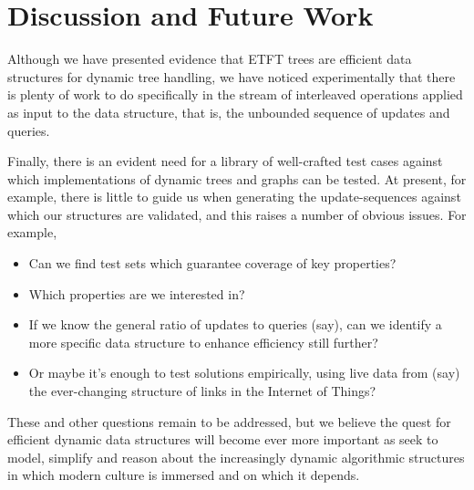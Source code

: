 \section{Discussion and Future Work} 
\label{sec:Concl} 
\label{sec:discussion}

Although we have presented evidence that ETFT trees are efficient data structures for dynamic tree handling, we have noticed experimentally that there is plenty of work to do specifically in the stream of interleaved operations applied as input to the data structure, that is, the unbounded sequence of updates and queries.

Finally, there is an evident need for a library of well-crafted test cases against which implementations of dynamic trees and graphs can be tested. At present, for example, there is little to guide us when generating the update-sequences against which our structures are validated, and this raises a number of obvious issues. For example,

\begin{itemize}
\item Can we find test sets which guarantee coverage of key properties?

\item Which properties are we interested in?

\item If we know the general ratio of updates to queries (say), can we identify a more specific data structure to enhance efficiency still further?

\item Or maybe it’s enough to test solutions empirically, using live data from (say) the ever-changing structure of links in the Internet of Things?

\end{itemize}

These and other questions remain to be addressed, but we believe the quest for efficient dynamic data structures will become ever more important as seek to model, simplify and reason about the increasingly dynamic algorithmic structures in which modern culture is immersed and on which it depends.



